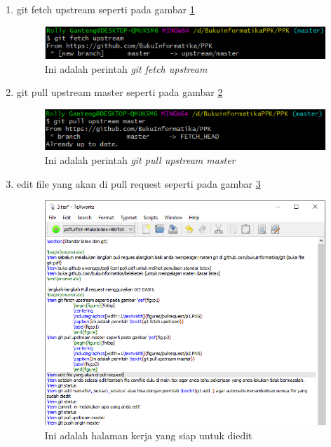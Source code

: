 \begin{enumerate}
\item git fetch upstream seperti pada gambar \ref{fig:p1}
		\begin{figure}[!htbp]
		\centering
		\includegraphics[width=1\textwidth]{figures/pullrequest/p1.PNG}
		\caption{Ini adalah perintah \textit{git fetch upstream}}
		\label{fig:p1}
		\end{figure}
\item git pull upstream master seperti pada gambar \ref{fig:p2}
		\begin{figure}[!htbp]
		\centering
		\includegraphics[width=1\textwidth]{figures/pullrequest/p2.PNG}
		\caption{Ini adalah perintah \textit{git pull upstream master}}
		\label{fig:p2}
		\end{figure}
\item edit file yang akan di pull request seperti pada gambar \ref{fig:p3}
		\begin{figure}[!htbp]
		\centering
		\includegraphics[width=1\textwidth]{figures/pullrequest/p3.PNG}
		\caption{Ini adalah halaman kerja yang siap untuk diedit}
		\label{fig:p3}

\end{figure}
\end{enumerate}
